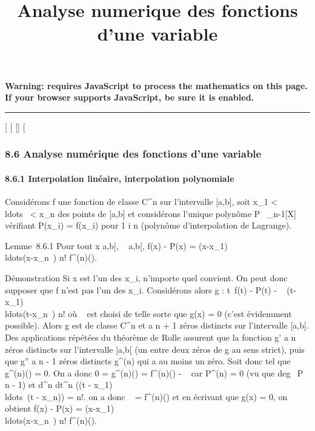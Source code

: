 \documentclass[]{article}
\title{Analyse numerique des fonctions d'une variable}
\author{}
\date{}
\begin{document}
\maketitle

\textbf{Warning: 
requires JavaScript to process the mathematics on this page.\\ If your
browser supports JavaScript, be sure it is enabled.}

\begin{center}\rule{3in}{0.4pt}\end{center}

{[}
{[}
{[}{]}
{[}

\subsubsection{8.6 Analyse numérique des fonctions d'une variable}

\paragraph{8.6.1 Interpolation linéaire, interpolation polynomiale}

Considérons f une fonction de classe C^n sur l'intervalle
{[}a,b{]}, soit x\_1 \textless{}
\\ldots~ \textless{}
x\_n des points de {[}a,b{]} et considérons l'unique polynôme P
\in {}~\_n-1{[}X{]} vérifiant P(x\_i) = f(x\_i) pour
1 \leq i \leq n (polynôme d'interpolation de Lagrange).

Lemme~8.6.1 Pour tout x \in {[}a,b{]}, \exists~\zeta
\in{]}a,b{[}, f(x) - P(x) =
(x-x\_1)\\ldots(x-x\_n~)
\over n! f^(n)(\zeta).

Démonstration Si x est l'un des x\_i, n'importe quel \zeta convient.
On peut donc supposer que f n'est pas l'un des x\_i. Considérons
alors g : t\mapsto~f(t) - P(t) - \lambda~
(t-x\_1)\\ldots(t-x\_n~)
\over n! où \lambda~ est choisi de telle sorte que g(x) = 0
(c'est évidemment possible). Alors g est de classe C^n et a n
+ 1 zéros distincts sur l'intervalle {[}a,b{]}. Des applications
répétées du théorème de Rolle assurent que la fonction g' a n zéros
distincts sur l'intervalle {]}a,b{[} (un entre deux zéros de g au sens
strict), puis que g'' a n - 1 zéros distincts \jmathusque g^(n)
qui a au moins un zéro. Soit donc \zeta tel que g^(n)(\zeta) = 0. On
a donc 0 = g^(n)(\zeta) = f^(n)(\zeta) - \lambda~ car
P^(n) = 0 (vu que deg~ P \leq n - 1) et
 d^n \over dt^n ((t -
x\_1)\\ldots~(t
- x\_n)) = n!. on a donc \lambda~ = f^(n)(\zeta) et en écrivant
que g(x) = 0, on obtient f(x) - P(x) =
(x-x\_1)\\ldots(x-x\_n~)
\over n! f^(n)(\zeta).
\end{document}
